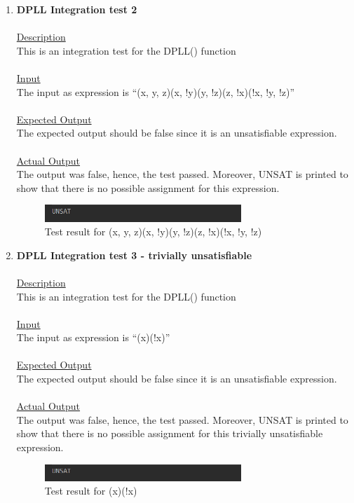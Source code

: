 \documentclass{article}
\newcommand{\quotes}[1]{``#1''}
\begin{document}
\begin{enumerate}
					
		\item \textbf{DPLL Integration test 2}\\\\
		\underline{Description}\\
		\indent This is an integration test for the DPLL() function\\\\
		\underline{Input}\\
		\indent The input as expression is \quotes{(x, y, z)(x, !y)(y, !z)(z, !x)(!x, !y, !z)}\\	\\
		\underline{Expected Output}\\
		\indent The expected output should be false since it is an unsatisfiable expression.\\\\
		\underline{Actual Output}\\
		The output was false, hence, the test passed. Moreover, UNSAT is printed to show that there is no possible assignment for this expression. 
				\begin{figure}[H]
					\centering
			 			\includegraphics[width=0.7\textwidth]{dplltest2.png}
			 			\centering
			  			\caption{Test result for (x, y, z)(x, !y)(y, !z)(z, !x)(!x, !y, !z)}
			  			\label{fig:dplltest2}
					\end{figure}
					
					
				\item \textbf{DPLL Integration test 3 - trivially unsatisfiable}\\\\
		\underline{Description}\\
		\indent This is an integration test for the DPLL() function\\\\
		\underline{Input}\\
		\indent The input as expression is \quotes{(x)(!x)}\\	\\
		\underline{Expected Output}\\
		\indent The expected output should be false since it is an unsatisfiable expression.\\\\
		\underline{Actual Output}\\
		The output was false, hence, the test passed. Moreover, UNSAT is printed to show that there is no possible assignment for this trivially unsatisfiable expression. 
				\begin{figure}[H]
					\centering
			 			\includegraphics[width=0.7\textwidth]{dplltest2.png}
			 			\centering
			  			\caption{Test result for (x)(!x)}
			  			\label{fig:dplltest3}
					\end{figure}
					

\end{enumerate}
\end{document}
